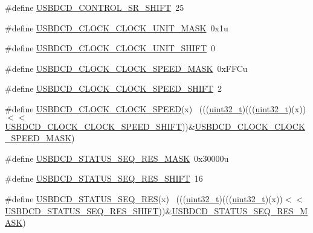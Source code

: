 \begin{DoxyCompactItemize}
\item 
\#define \hyperlink{group___u_s_b_d_c_d___register___masks_ga122056290d48016111c0a5e3cb8b63c4}{U\+S\+B\+D\+C\+D\+\_\+\+C\+O\+N\+T\+R\+O\+L\+\_\+\+S\+R\+\_\+\+S\+H\+I\+FT}~25
\item 
\#define \hyperlink{group___u_s_b_d_c_d___register___masks_ga7c8eace6dde39098426fe04c6b32bf92}{U\+S\+B\+D\+C\+D\+\_\+\+C\+L\+O\+C\+K\+\_\+\+C\+L\+O\+C\+K\+\_\+\+U\+N\+I\+T\+\_\+\+M\+A\+SK}~0x1u
\item 
\#define \hyperlink{group___u_s_b_d_c_d___register___masks_gae3126a9608c08fe560b91f7b742bb98a}{U\+S\+B\+D\+C\+D\+\_\+\+C\+L\+O\+C\+K\+\_\+\+C\+L\+O\+C\+K\+\_\+\+U\+N\+I\+T\+\_\+\+S\+H\+I\+FT}~0
\item 
\#define \hyperlink{group___u_s_b_d_c_d___register___masks_gaf53eaecf9a4de0251c8906350ac989ae}{U\+S\+B\+D\+C\+D\+\_\+\+C\+L\+O\+C\+K\+\_\+\+C\+L\+O\+C\+K\+\_\+\+S\+P\+E\+E\+D\+\_\+\+M\+A\+SK}~0x\+F\+F\+Cu
\item 
\#define \hyperlink{group___u_s_b_d_c_d___register___masks_gaa1667808247c5b8355c58b93a4e80c8a}{U\+S\+B\+D\+C\+D\+\_\+\+C\+L\+O\+C\+K\+\_\+\+C\+L\+O\+C\+K\+\_\+\+S\+P\+E\+E\+D\+\_\+\+S\+H\+I\+FT}~2
\item 
\#define \hyperlink{group___u_s_b_d_c_d___register___masks_gab612fd6bc4a6d4ebb440f33c4f0561b7}{U\+S\+B\+D\+C\+D\+\_\+\+C\+L\+O\+C\+K\+\_\+\+C\+L\+O\+C\+K\+\_\+\+S\+P\+E\+ED}(x)                        ~(((\hyperlink{_p_e___types_8h_a33594304e786b158f3fb30289278f5af}{uint32\+\_\+t})(((\hyperlink{_p_e___types_8h_a33594304e786b158f3fb30289278f5af}{uint32\+\_\+t})(x))$<$$<$\hyperlink{group___u_s_b_d_c_d___register___masks_gaa1667808247c5b8355c58b93a4e80c8a}{U\+S\+B\+D\+C\+D\+\_\+\+C\+L\+O\+C\+K\+\_\+\+C\+L\+O\+C\+K\+\_\+\+S\+P\+E\+E\+D\+\_\+\+S\+H\+I\+FT}))\&\hyperlink{group___u_s_b_d_c_d___register___masks_gaf53eaecf9a4de0251c8906350ac989ae}{U\+S\+B\+D\+C\+D\+\_\+\+C\+L\+O\+C\+K\+\_\+\+C\+L\+O\+C\+K\+\_\+\+S\+P\+E\+E\+D\+\_\+\+M\+A\+SK})
\item 
\#define \hyperlink{group___u_s_b_d_c_d___register___masks_gaa1c55980f5e31bfe02a2f4bc3bcf753d}{U\+S\+B\+D\+C\+D\+\_\+\+S\+T\+A\+T\+U\+S\+\_\+\+S\+E\+Q\+\_\+\+R\+E\+S\+\_\+\+M\+A\+SK}~0x30000u
\item 
\#define \hyperlink{group___u_s_b_d_c_d___register___masks_ga4d1d707ac9f9afb0b114a4032951971d}{U\+S\+B\+D\+C\+D\+\_\+\+S\+T\+A\+T\+U\+S\+\_\+\+S\+E\+Q\+\_\+\+R\+E\+S\+\_\+\+S\+H\+I\+FT}~16
\item 
\#define \hyperlink{group___u_s_b_d_c_d___register___masks_ga283c30df592d96d824cab96f6b9bbeee}{U\+S\+B\+D\+C\+D\+\_\+\+S\+T\+A\+T\+U\+S\+\_\+\+S\+E\+Q\+\_\+\+R\+ES}(x)                              ~(((\hyperlink{_p_e___types_8h_a33594304e786b158f3fb30289278f5af}{uint32\+\_\+t})(((\hyperlink{_p_e___types_8h_a33594304e786b158f3fb30289278f5af}{uint32\+\_\+t})(x))$<$$<$\hyperlink{group___u_s_b_d_c_d___register___masks_ga4d1d707ac9f9afb0b114a4032951971d}{U\+S\+B\+D\+C\+D\+\_\+\+S\+T\+A\+T\+U\+S\+\_\+\+S\+E\+Q\+\_\+\+R\+E\+S\+\_\+\+S\+H\+I\+FT}))\&\hyperlink{group___u_s_b_d_c_d___register___masks_gaa1c55980f5e31bfe02a2f4bc3bcf753d}{U\+S\+B\+D\+C\+D\+\_\+\+S\+T\+A\+T\+U\+S\+\_\+\+S\+E\+Q\+\_\+\+R\+E\+S\+\_\+\+M\+A\+SK})

\end{DoxyCompactItemize}
